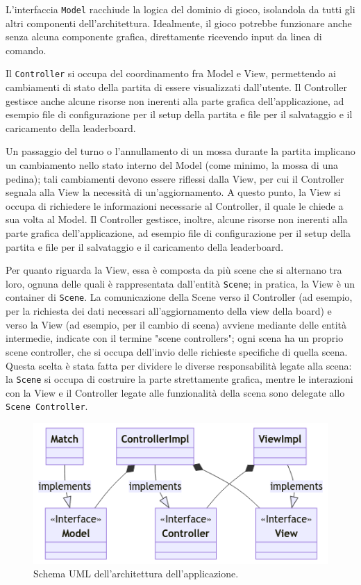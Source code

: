 \documentclass[a4paper,12pt]{report}
\begin{document}
L'interfaccia \texttt{Model} racchiude la logica del dominio di gioco, isolandola da tutti gli altri componenti dell'architettura. Idealmente, il gioco potrebbe funzionare anche senza alcuna componente grafica, direttamente ricevendo input da linea di comando.

Il \texttt{Controller} si occupa del coordinamento fra Model e View, permettendo ai cambiamenti di stato della partita di essere visualizzati dall'utente. Il Controller gestisce anche alcune risorse non inerenti alla parte grafica dell'applicazione, ad esempio file di configurazione per il setup della partita e file per il salvataggio e il caricamento della leaderboard.

Un passaggio del turno o l'annullamento di un mossa durante la partita implicano un cambiamento nello stato interno del Model (come minimo, la mossa di una pedina); tali cambiamenti devono essere riflessi dalla View, per cui il Controller segnala alla View la necessità di un'aggiornamento. A questo punto, la View si occupa di richiedere le informazioni necessarie al Controller, il quale le chiede a sua volta al Model.
Il Controller gestisce, inoltre, alcune risorse non inerenti alla parte grafica dell'applicazione, ad esempio file di configurazione per il setup della partita e file per il salvataggio e il caricamento della leaderboard.

Per quanto riguarda la View, essa è composta da più scene che si alternano tra loro, ognuna delle quali è rappresentata dall'entità \texttt{Scene}; in pratica, la View è un container di \texttt{Scene}. La comunicazione della Scene verso il Controller (ad esempio, per la richiesta dei dati necessari all'aggiornamento della view della board) e verso la View (ad esempio, per il cambio di scena) avviene mediante delle entità intermedie, indicate con il termine "scene controllers"; ogni scena ha un proprio scene controller, che si occupa dell'invio delle richieste specifiche di quella scena. Questa scelta è stata fatta per dividere le diverse responsabilità legate alla scena: la \texttt{Scene} si occupa di costruire la parte strettamente grafica, mentre le interazioni con la View e il Controller legate alle funzionalità della scena sono delegate allo \texttt{Scene Controller}.

\begin{figure}[H]
\centering
\includegraphics[width=\textwidth]{images/architecture.png}
\caption{Schema UML dell'architettura dell'applicazione.}
\label{images:architecture}
\end{figure}
\end{document}
